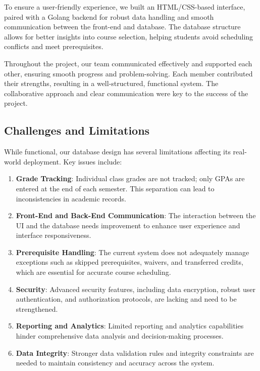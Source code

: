 \documentclass[12pt]{article}
\begin{document}
To ensure a user-friendly experience, we built an HTML/CSS-based interface, paired with a Golang backend for robust data handling and smooth communication between the front-end and database. The database structure allows for better insights into course selection, helping students avoid scheduling conflicts and meet prerequisites.

Throughout the project, our team communicated effectively and supported each other, ensuring smooth progress and problem-solving. Each member contributed their strengths, resulting in a well-structured, functional system. The collaborative approach and clear communication were key to the success of the project.

\subsection{Challenges and Limitations}
While functional, our database design has several limitations affecting its real-world deployment. Key issues include:

\begin{enumerate}
	\item \textbf{Grade Tracking}: Individual class grades are not tracked; only GPAs are entered at the end of each semester. This separation can lead to inconsistencies in academic records.

    \item \textbf{Front-End and Back-End Communication}: The interaction between the UI and the database needs improvement to enhance user experience and interface responsiveness.

    \item \textbf{Prerequisite Handling}: The current system does not adequately manage exceptions such as skipped prerequisites, waivers, and transferred credits, which are essential for accurate course scheduling.

	\item \textbf{Security}: Advanced security features, including data encryption, robust user authentication, and authorization protocols, are lacking and need to be strengthened.

    \item \textbf{Reporting and Analytics}: Limited reporting and analytics capabilities hinder comprehensive data analysis and decision-making processes.

    \item \textbf{Data Integrity}: Stronger data validation rules and integrity constraints are needed to maintain consistency and accuracy across the system.
\end{enumerate}
\end{document}
